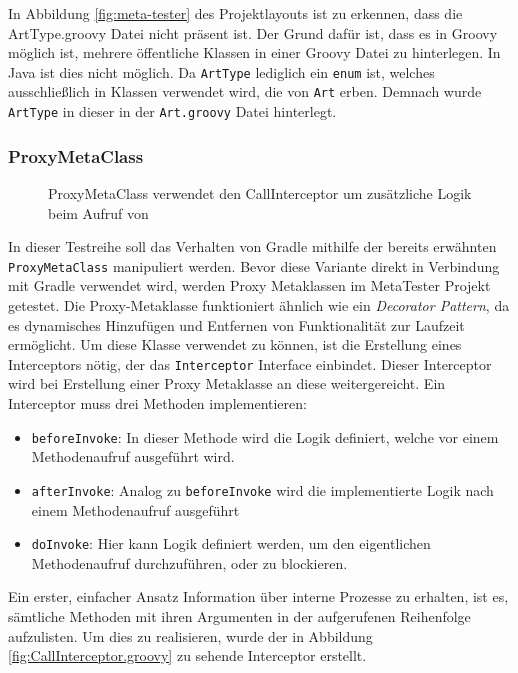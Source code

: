 In Abbildung \ref{fig:meta-tester} des Projektlayouts ist zu erkennen, dass die ArtType.groovy Datei nicht präsent ist. 
Der Grund dafür ist, dass es in Groovy möglich ist, mehrere öffentliche Klassen in einer Groovy Datei zu hinterlegen. 
In Java ist dies nicht möglich. 
Da \texttt{ArtType} lediglich ein \texttt{enum} ist, welches ausschließlich in Klassen verwendet wird, die von \texttt{Art} erben.
Demnach wurde \texttt{ArtType} in dieser in der \texttt{Art.groovy} Datei hinterlegt.


\subsubsection{ProxyMetaClass}


\begin{figure}[hbt!]
	\centering
	
	\caption{ProxyMetaClass verwendet den CallInterceptor um zusätzliche Logik beim Aufruf von }
	\label{fig:meta-proxy}
\end{figure}


In dieser Testreihe soll das Verhalten von Gradle mithilfe der bereits erwähnten \\ \texttt{ProxyMetaClass} manipuliert werden.
Bevor diese Variante direkt in Verbindung mit Gradle verwendet wird, werden Proxy Metaklassen im MetaTester Projekt getestet. 
Die Proxy-Metaklasse funktioniert ähnlich wie ein \textit{Decorator Pattern}, da es dynamisches Hinzufügen und Entfernen von Funktionalität zur Laufzeit ermöglicht.
Um diese Klasse verwendet zu können, ist die Erstellung eines Interceptors nötig, der das \texttt{Interceptor} Interface einbindet. 
Dieser Interceptor wird bei Erstellung einer Proxy Metaklasse an diese weitergereicht. 
Ein Interceptor muss drei Methoden implementieren:

\begin{itemize}
	\item \texttt{beforeInvoke}:
	In dieser Methode wird die Logik definiert, welche vor einem Methodenaufruf ausgeführt wird.
	\item \texttt{afterInvoke}:
	Analog zu \texttt{beforeInvoke} wird die implementierte Logik nach einem Methodenaufruf ausgeführt
	\item \texttt{doInvoke}:
	Hier kann Logik definiert werden, um den eigentlichen Methodenaufruf durchzuführen, oder zu blockieren.
\end{itemize}

Ein erster, einfacher Ansatz Information über interne Prozesse zu erhalten, ist es, sämtliche Methoden mit ihren Argumenten in der aufgerufenen Reihenfolge aufzulisten. 
Um dies zu realisieren, wurde der in Abbildung \ref{fig:CallInterceptor.groovy} zu sehende Interceptor erstellt.

